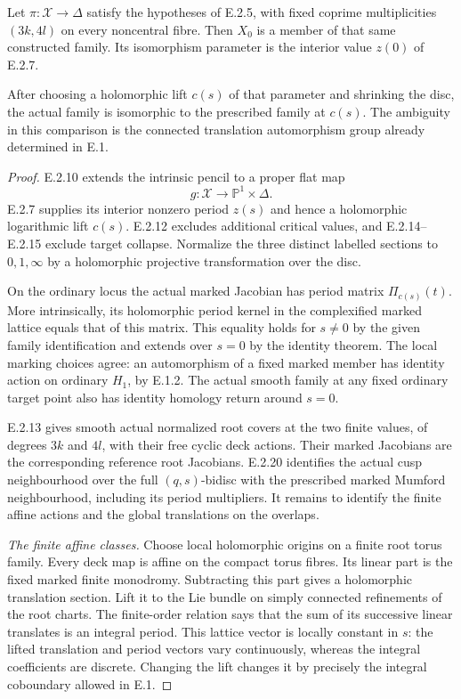 \begin{proposition}
Let $\pi:\mathcal X\to\Delta$ satisfy the hypotheses of
E.2.5, with fixed coprime multiplicities $(3k,4l)$ on
every noncentral fibre.  Then $X_0$ is a member of that
same constructed family.  Its isomorphism parameter is
the interior value $z(0)$ of E.2.7.

After choosing a holomorphic lift $c(s)$ of that parameter
and shrinking the disc, the actual family is isomorphic
to the prescribed family at $c(s)$.  The ambiguity in
this comparison is the connected translation automorphism
group already determined in E.1.
\end{proposition}
\begin{proof}
E.2.10 extends the intrinsic pencil to a proper flat map
\[
 g:\mathcal X\longrightarrow\mathbb P^1\times\Delta.
\]
E.2.7 supplies its interior nonzero period $z(s)$ and hence
a holomorphic logarithmic lift $c(s)$.  E.2.12 excludes
additional critical values, and E.2.14--E.2.15 exclude
target collapse.  Normalize the three distinct labelled
sections to $0,1,\infty$ by a holomorphic projective
transformation over the disc.

On the ordinary locus the actual marked Jacobian has
period matrix $\Pi_{c(s)}(t)$.  More intrinsically, its
holomorphic period kernel in the complexified marked
lattice equals that of this matrix.  This equality holds
for $s\ne0$ by the given family identification and extends
over $s=0$ by the identity theorem.  The local marking
choices agree: an automorphism of a fixed marked member
has identity action on ordinary $H_1$, by E.1.2.  The
actual smooth family at any fixed ordinary target point
also has identity homology return around $s=0$.

E.2.13 gives smooth actual normalized root covers at the
two finite values, of degrees $3k$ and $4l$, with their
free cyclic deck actions.  Their marked Jacobians are
the corresponding reference root Jacobians.  E.2.20
identifies the actual cusp neighbourhood over the full
$(q,s)$-bidisc with the prescribed marked Mumford
neighbourhood, including its period multipliers.
It remains to identify the finite affine actions and
the global translations on the overlaps.

\emph{The finite affine classes.}
Choose local holomorphic origins on a finite root torus
family.  Every deck map is affine on the compact torus
fibres.  Its linear part is the fixed marked finite
monodromy.  Subtracting this part gives a holomorphic
translation section.  Lift it to the Lie bundle on
simply connected refinements of the root charts.
The finite-order relation says that the sum of its
successive linear translates is an integral period.
This lattice vector is locally constant in $s$:
the lifted translation and period vectors vary
continuously, whereas the integral coefficients are
discrete.  Changing the lift changes it by precisely
the integral coboundary allowed in E.1.


\end{proof}
